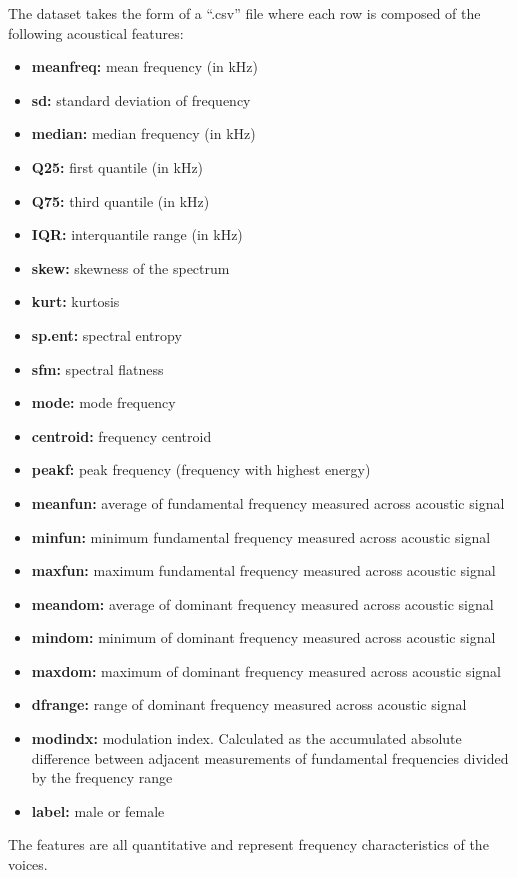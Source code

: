 The dataset takes the form of a ``.csv'' file where each row is composed of the following acoustical features:
\begin{itemize}
	\item \textbf{meanfreq:} mean frequency (in kHz)
	\item \textbf{sd:} standard deviation of frequency
	\item \textbf{median:} median frequency (in kHz)
	\item \textbf{Q25:} first quantile (in kHz)
	\item \textbf{Q75:} third quantile (in kHz)
	\item \textbf{IQR:} interquantile range (in kHz)
	\item \textbf{skew:} skewness of the spectrum
	\item \textbf{kurt:} kurtosis
	\item \textbf{sp.ent:} spectral entropy
	\item \textbf{sfm:} spectral flatness
	\item \textbf{mode:} mode frequency
	\item \textbf{centroid:} frequency centroid 
	\item \textbf{peakf:} peak frequency (frequency with highest energy)
	\item \textbf{meanfun:} average of fundamental frequency measured across acoustic signal
	\item \textbf{minfun:} minimum fundamental frequency measured across acoustic signal
	\item \textbf{maxfun:} maximum fundamental frequency measured across acoustic signal
	\item \textbf{meandom:} average of dominant frequency measured across acoustic signal
	\item \textbf{mindom:} minimum of dominant frequency measured across acoustic signal
	\item \textbf{maxdom:} maximum of dominant frequency measured across acoustic signal
	\item \textbf{dfrange:} range of dominant frequency measured across acoustic signal
	\item \textbf{modindx:} modulation index. Calculated as the accumulated absolute difference between adjacent measurements of fundamental frequencies divided by the frequency range
	\item \textbf{label:} male or female
\end{itemize}

The features are all quantitative and represent frequency characteristics of the voices.
